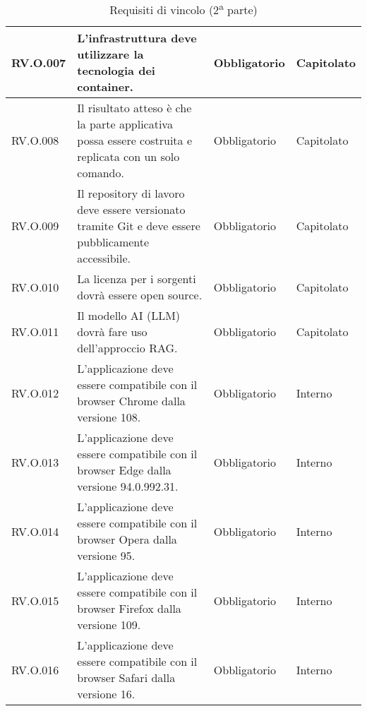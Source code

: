 \begin{table}[H]
\centering
    \begin{tabular}{|C{2.7cm}|L{7.2cm}|C{2.7cm}|C{2cm}|}
        \hline
        RV.O.007 &  L’infrastruttura deve utilizzare la tecnologia dei container.
         & Obbligatorio & Capitolato \\
        \hline
         RV.O.008 & Il risultato atteso è che la parte applicativa possa essere costruita e replicata con un solo comando.
         & Obbligatorio & Capitolato \\
        \hline
        RV.O.009 & Il repository di lavoro deve essere versionato tramite Git e deve essere pubblicamente accessibile.
         & Obbligatorio & Capitolato \\
        \hline
        RV.O.010 & La licenza per i sorgenti dovrà essere open source.
         & Obbligatorio & Capitolato \\
        \hline
        RV.O.011 & Il modello AI (LLM) dovrà fare uso dell’approccio RAG.
         & Obbligatorio & Capitolato \\
        \hline
        RV.O.012 & L’applicazione deve essere compatibile con il browser Chrome dalla
        versione 108.
         & Obbligatorio & Interno \\
        \hline
        RV.O.013 & L’applicazione deve essere compatibile con il browser Edge dalla versione 94.0.992.31.
         & Obbligatorio & Interno \\
        \hline
        RV.O.014 & L’applicazione deve essere compatibile con il browser Opera dalla
        versione 95.
         & Obbligatorio & Interno \\
        \hline
        RV.O.015 & L’applicazione deve essere compatibile con il browser Firefox dalla
versione 109.
         & Obbligatorio & Interno \\
        \hline
        RV.O.016 & L’applicazione deve essere compatibile con il browser Safari dalla
versione 16.
         & Obbligatorio & Interno \\
        \hline
    \end{tabular}
    \caption{Requisiti di vincolo (2\textsuperscript{a}  parte)}
\end{table}